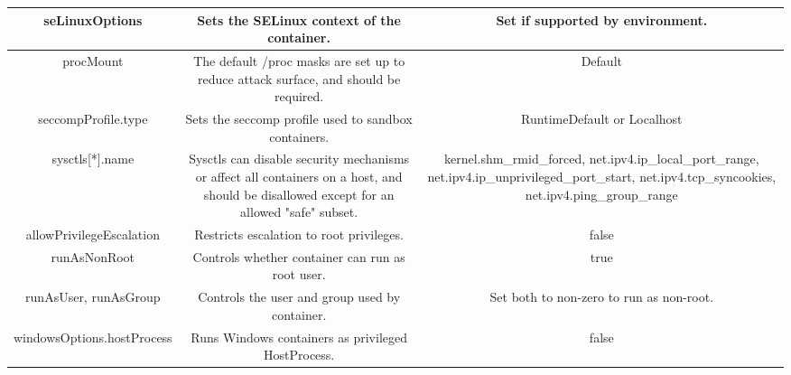 \documentclass[english, 12pt, a4paper, sci, utf8, a-2b, online]{aaltothesis}
\begin{document}
\begin{table}[H]
\begin{tabularx}{\textwidth}{CCC}
    seLinuxOptions & Sets the SELinux context of the container. & Set if supported by environment. \\ \hline
    procMount & The default /proc masks are set up to reduce attack surface, and should be required. & Default \\ \hline
    seccompProfile.type & Sets the seccomp profile used to sandbox containers. & RuntimeDefault or Localhost \\ \hline
    sysctls[*].name & Sysctls can disable security mechanisms or affect all containers on a host, and should be disallowed except for an allowed "safe" subset. & kernel.shm\_rmid\_forced, net.ipv4.ip\_local\_port\_range, net.ipv4.ip\_unprivileged\_port\_start, net.ipv4.tcp\_syncookies, net.ipv4.ping\_group\_range \\ \hline
    allowPrivilegeEscalation & Restricts escalation to root privileges. & false \\ \hline
    runAsNonRoot & Controls whether container can run as root user. & true \\ \hline
    runAsUser, runAsGroup & Controls the user and group used by container. & Set both to non-zero to run as non-root. \\ \hline
    windowsOptions.hostProcess & Runs Windows containers as privileged HostProcess. & false \\ \hline
  \end{tabularx}
\end{table}



\end{document}

